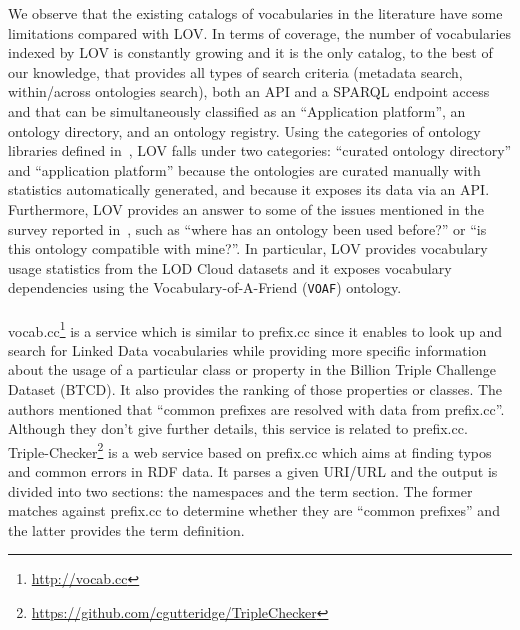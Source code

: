 We observe that the existing catalogs of vocabularies in the literature have some limitations compared with LOV. In terms of coverage, the number of vocabularies indexed by LOV is constantly growing and it is the only catalog, to the best of our knowledge, that provides all types of search criteria (metadata search, within/across ontologies search), both an API and a SPARQL endpoint access and that can be simultaneously classified as an ``Application platform'', an ontology directory, and an ontology registry. Using the categories of ontology libraries defined in~\cite{AquinJoWS12}, LOV falls under two categories: ``curated ontology directory'' and ``application platform'' because the ontologies are curated manually with statistics automatically generated, and because it exposes its data via an API. Furthermore, LOV provides an answer to some of the issues mentioned in the survey reported in~\cite{AquinJoWS12}, such as ``where has an ontology been used before?'' or ``is this ontology compatible with mine?''. In particular, LOV provides vocabulary usage statistics from the LOD Cloud datasets and it exposes vocabulary dependencies using the Vocabulary-of-A-Friend (\texttt{VOAF}) ontology.

\paragraph{}
vocab.cc\footnote{\url{http://vocab.cc}} is a service which is similar to prefix.cc since it enables to look up and search for Linked Data vocabularies while providing more specific information about the usage of a particular class or property in the Billion Triple Challenge Dataset (BTCD). It also provides the ranking of those properties or classes. The authors mentioned that ``common prefixes are resolved with data from prefix.cc''. Although they don't give further details, this service is  related to prefix.cc. Triple-Checker\footnote{\url{https://github.com/cgutteridge/TripleChecker}} is a web service based on prefix.cc which aims at finding typos and common errors in RDF data. It parses a given URI/URL and the output is divided into two sections: the namespaces and the term section. The former matches against prefix.cc to determine whether they are ``common prefixes'' and the latter provides the term definition.


